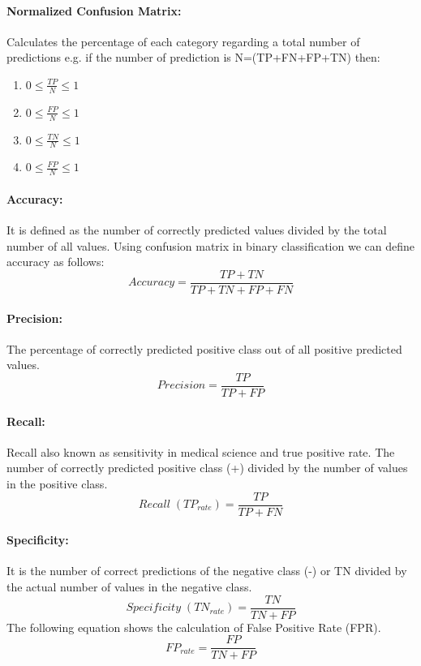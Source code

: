 \paragraph{Normalized Confusion Matrix:}
Calculates the percentage of each category regarding a total number of predictions e.g. if the number of prediction is N=(TP+FN+FP+TN) then:
\begin{enumerate}
    \item $0\leq \frac{TP}{N} \leq 1$ \vspace*{-3mm}
    \item $0\leq \frac{FP}{N} \leq 1$ \vspace*{-3mm}
    \item $0\leq \frac{TN}{N} \leq 1$ \vspace*{-3mm}
    \item $0\leq \frac{FP}{N} \leq 1$ \vspace*{-3mm}
\end{enumerate}
\paragraph{Accuracy:}
It is defined as the number of correctly predicted values divided by the total number of all values. Using confusion matrix in binary classification we can define accuracy as follows:
\begin{equation}
    Accuracy= \frac{TP+TN}{TP+TN+FP+FN} 
\end{equation}

\paragraph{Precision:}
The percentage of correctly predicted positive class out of all positive predicted values.
\begin{equation}
Precision = \frac{TP}{TP+FP}    
\end{equation}

\paragraph{Recall:}
Recall also known as sensitivity in medical science and true positive rate.
The number of correctly predicted positive class (+) divided by the number of values in the positive class.
\begin{equation}
   Recall\;(TP_{rate}) = \frac{TP}{TP+FN}
\end{equation}
\paragraph{Specificity:}
It is the number of correct predictions of the negative class (-) or TN divided by the actual number of values in the negative class.
\begin{equation}
    Specificity\;(TN_{rate})=\frac{TN}{TN+FP}
\end{equation}
The following equation shows the calculation of False Positive Rate (FPR).
\begin{equation}
    FP_{rate}=\frac{FP}{TN+FP} 
\end{equation}

